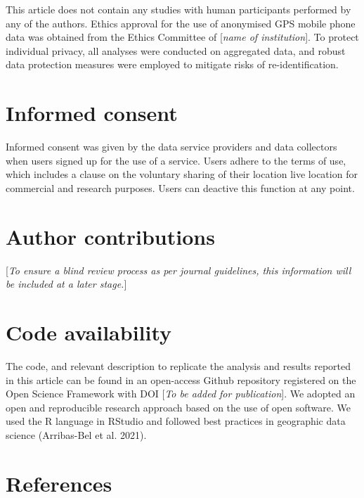\documentclass[
  sn-nature,
  11pt,
]{sn-jnl}
\begin{document}
This article does not contain any studies with human participants
performed by any of the authors. Ethics approval for the use of
anonymised GPS mobile phone data was obtained from the Ethics Committee
of {[}\emph{name of institution}{]}. To protect individual privacy, all
analyses were conducted on aggregated data, and robust data protection
measures were employed to mitigate risks of re-identification.

\section{Informed consent}\label{informed-consent}

Informed consent was given by the data service providers and data
collectors when users signed up for the use of a service. Users adhere
to the terms of use, which includes a clause on the voluntary sharing of
their location live location for commercial and research purposes. Users
can deactive this function at any point.

\section{Author contributions}\label{author-contributions}

{[}\emph{To ensure a blind review process as per journal guidelines,
this information will be included at a later stage.}{]}

\section{Code availability}\label{code-availability}

The code, and relevant description to replicate the analysis and results
reported in this article can be found in an open-access Github
repository registered on the Open Science Framework with DOI {[}\emph{To
be added for publication}{]}. We adopted an open and reproducible
research approach based on the use of open software. We used the R
language in RStudio and followed best practices in geographic data
science (Arribas-Bel et al. 2021).

\section*{References}\label{references}
\end{document}
